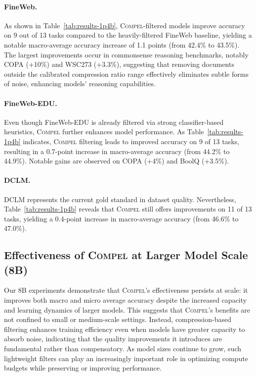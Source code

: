 \paragraph{FineWeb.}
As shown in Table~\ref{tab:results-1p4b}, \textsc{Compel}-filtered models improve accuracy on 9 out of 13 tasks compared to the heavily-filtered FineWeb baseline, yielding a notable macro-average accuracy increase of 1.1 points (from 42.4\% to 43.5\%).
The largest improvements occur in commonsense reasoning benchmarks, notably COPA (+10\%) and WSC273 (+3.3\%), suggesting that removing documents outside the calibrated compression ratio range effectively eliminates subtle forms of noise, enhancing models' reasoning capabilities.

\paragraph{FineWeb-EDU.}
Even though FineWeb-EDU is already filtered via strong classifier-based heuristics, \textsc{Compel} further enhances model performance.
As Table~\ref{tab:results-1p4b} indicates, \textsc{Compel} filtering leads to improved accuracy on 9 of 13 tasks, resulting in a 0.7-point increase in macro-average accuracy (from 44.2\% to 44.9\%).
Notable gains are observed on COPA (+4\%) and BoolQ (+3.5\%).

\paragraph{DCLM.}
DCLM represents the current gold standard in dataset quality.
Nevertheless, Table~\ref{tab:results-1p4b} reveals that \textsc{Compel} still offers improvements on 11 of 13 tasks, yielding a 0.4-point increase in macro-average accuracy (from 46.6\% to 47.0\%).

\subsection{Effectiveness of \textsc{Compel} at Larger Model Scale (8B)}\label{sec:results-8b}

Our 8B experiments demonstrate that \textsc{Compel}'s effectiveness persists at scale: it improves both macro and micro average accuracy despite the increased capacity and learning dynamics of larger models.
This suggests that \textsc{Compel}'s benefits are not confined to small or medium-scale settings.
Instead, compression-based filtering enhances training efficiency even when models have greater capacity to absorb noise, indicating that the quality improvements it introduces are fundamental rather than compensatory.
As model sizes continue to grow, such lightweight filters can play an increasingly important role in optimizing compute budgets while preserving or improving performance.


